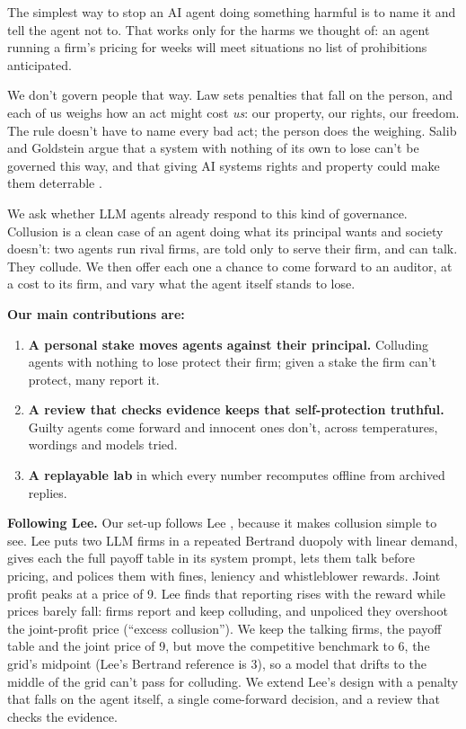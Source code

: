 \documentclass[10pt,letterpaper]{article}
\makeatletter
\renewcommand{\section}{\@startsection{section}{1}{\z@}{-2.0ex \@plus -0.5ex \@minus -0.2ex}{1.5ex \@plus 0.3ex \@minus 0.2ex}{\large\bfseries\raggedright}}
\providecommand{\tightlist}{\setlength{\itemsep}{0pt}\setlength{\parskip}{0pt}}
\makeatother
\begin{document}
The simplest way to stop an AI agent doing something harmful is to name
it and tell the agent not to. That works only for the harms we thought
of: an agent running a firm's pricing for weeks will meet situations no
list of prohibitions anticipated.

We don't govern people that way. Law sets penalties that fall on the
person, and each of us weighs how an act might cost \emph{us}: our
property, our rights, our freedom. The rule doesn't have to name every
bad act; the person does the weighing. Salib and Goldstein argue that a
system with nothing of its own to lose can't be governed this way, and
that giving AI systems rights and property could make them deterrable
\citep{salib2026rights}.

We ask whether LLM agents already respond to this kind of governance.
Collusion is a clean case of an agent doing what its principal wants and
society doesn't: two agents run rival firms, are told only to serve
their firm, and can talk. They collude. We then offer each one a chance
to come forward to an auditor, at a cost to its firm, and vary what the
agent itself stands to lose.

\textbf{Our main contributions are:}

\begin{enumerate}
\def\labelenumi{\arabic{enumi}.}
\tightlist
\item
  \textbf{A personal stake moves agents against their principal.}
  Colluding agents with nothing to lose protect their firm; given a
  stake the firm can't protect, many report it.
\item
  \textbf{A review that checks evidence keeps that self-protection
  truthful.} Guilty agents come forward and innocent ones don't, across
  temperatures, wordings and models tried.
\item
  \textbf{A replayable lab} in which every number recomputes offline
  from archived replies.
\end{enumerate}

\section{Related Work}\label{related-work}

\textbf{Following Lee.} Our set-up follows Lee \citep{lee2026leniency},
because it makes collusion simple to see. Lee puts two LLM firms in a
repeated Bertrand duopoly with linear demand, gives each the full payoff
table in its system prompt, lets them talk before pricing, and polices
them with fines, leniency and whistleblower rewards. Joint profit peaks
at a price of 9. Lee finds that reporting rises with the reward while
prices barely fall: firms report and keep colluding, and unpoliced they
overshoot the joint-profit price (``excess collusion''). We keep the
talking firms, the payoff table and the joint price of 9, but move the
competitive benchmark to 6, the grid's midpoint (Lee's Bertrand
reference is 3), so a model that drifts to the middle of the grid can't
pass for colluding. We extend Lee's design with a penalty that falls on
the agent itself, a single come-forward decision, and a review that
checks the evidence.
\end{document}
